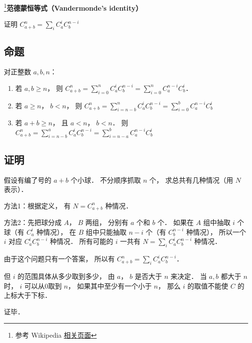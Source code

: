 

\footnote{参考 Wikipedia \href{https://en.wikipedia.org/wiki/Vandermonde's_identity}{相关页面}}\textbf{范德蒙恒等式（Vandermonde's identity）}

证明 $C_{a + b}^n = \sum_i C_a^i C_b^{n - i}$ 

\subsection{命题}
对正整数 $a,b,n$：
\begin{enumerate}
\item 若 $a,b \geqslant n$，  则 $C_{a + b}^n = \sum\limits_{i = 0}^n C_a^iC_b^{n - i}  = \sum\limits_{i = 0}^n C_a^{n - i} C_b^i$． 
\item 若 $a \geqslant n$，  $b < n$，   则  $C_{a + b}^n = \sum\limits_{i = n - b}^n C_a^iC_b^{n - i}  = \sum\limits_{i = 0}^b C_a^{n - i} C_b^i$ 
\item 若 $a + b \geqslant n$，   且 $a < n$，   $b < n$．  则  $C_{a + b}^n = \sum\limits_{i = n - b}^a C_a^i C_b^{n - i}  = \sum\limits_{i = n - a}^b C_a^{n - i} C_b^i$ 
\end{enumerate}

\subsection{证明}

假设有编了号的 $a+b$ 个小球． 不分顺序抓取 $n$ 个， 求总共有几种情况（用 $N$ 表示）．

方法1：根据定义， 有 $N = C_{a + b}^n$ 种情况．

方法2：先把球分成 $A$，  $B$ 两组， 分别有 $a$ 个和 $b$ 个． 如果在 $A$ 组中抽取 $i$ 个球（有 $C_a^i$ 种情况）， 在 $B$ 组中只能抽取  $n - i$ 个（有 $C_b^{n - i}$ 种情况）， 所以一个 $i$ 对应 $C_a^i C_b^{n - i}$ 种情况． 所有可能的 $i$ 一共有 $N = \sum_i C_a^i C_b^{n - i}$ 种情况．

由于这个问题只有一个答案， 所以有 $C_{a + b}^n = \sum_i C_a^i C_b^{n - i}$． 

但 $i$ 的范围具体从多少取到多少， 由 $a$，  $b$ 是否大于 $n$ 来决定． 当 $a,b$ 都大于 $n$ 时， $i$ 可以从0取到 $n$，  如果其中至少有一个小于 $n$，  那么 $i$ 的取值不能使 $C$ 的上标大于下标．

证毕．

